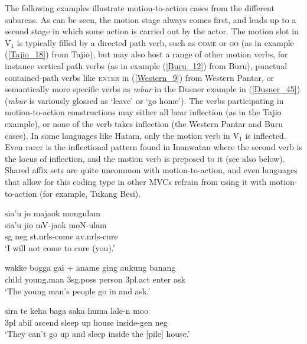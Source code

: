 The following examples illustrate motion-to-action cases from the different subareas. As can be seen, the motion stage always comes first, and leads up to a second stage in which some action is carried out by the actor. The motion slot in V$_1$ is typically filled by a directed path verb, such as \textsc{come} or \textsc{go} (as in example (\ref{Tajio_18}) from Tajio), but may also host a range of other motion verbs, for instance vertical path verbs (as in example (\ref{Buru_12}) from Buru), punctual contained-path verbs like \textsc{enter} in (\ref{Western_9}) from Western Pantar, or semantically more specific verbs as \textit{mbur} in the Dusner example in (\ref{Dusner_45}) (\textit{mbur} is variously glossed as `leave' or `go home'). The verbs participating in motion-to-action constructions may either all bear inflection (as in the Tajio example), or none of the verb takes inflection (the Western Pantar and Buru cases). In some languages like Hatam, only the motion verb in V$_1$ is inflected. Even rarer is the inflectional pattern found in Inanwatan where the second verb is the locus of inflection, and the motion verb is preposed to it (see also below). Shared affix sets are quite uncommon with motion-to-action, and even languages that allow for this coding type in other MVCs refrain from using it with motion-to-action (for example, Tukang Besi).

\ea \label{Tajio_18}
\gll sia’u jo majaok mongulam \\
sia’u jio mV-jaok moN-ulam \\
\acs{sg} \acs{neg} \acs{st}.\acs{nrls}-come \acs{av}.\acs{nrls}-cure \\
\glft `I will not come to cure (you).’ \\ 
\z
\xe

\ea \label{Western_9}
\gll wakke bogga gai + aname ging aukung banang \\
child young.man 3\acs{sg}.\acs{poss} person 3\acs{pl}.\acs{act} enter ask \\
\glft `The young man's people go in and ask.' \\ 
\z
\xe

\ea \label{Buru_12}
\gll sira te keha baga saka huma lale-n moo \\
3\acs{pl} \acs{abil} ascend sleep up house inside-\acs{gen} \acs{neg} \\
\glft `They can't go up and sleep inside the [pile] house.' \\ 
\z
\xe

